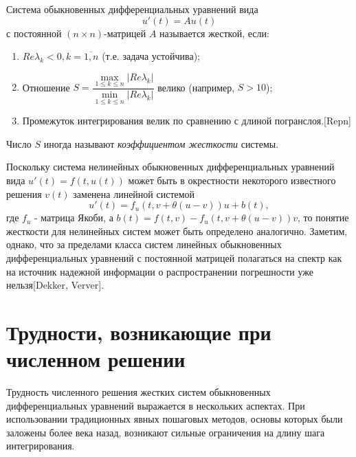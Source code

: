 \documentclass[a4paper,12pt]{report}
\begin{document}
  
\begin{Definition}Система обыкновенных дифференциальных уравнений вида
  \begin{equation}
  \label{stiff:eq}
    u'(t)=Au(t)
  \end{equation}
  с постоянной $(n \times n)$-матрицей $ A $ называется жесткой, если: 
  \begin{enumerate}
  \item $Re\lambda _k <0, k=\overbar{1,n}$ (т.е. задача устойчива);
  \item Отношение $S = \dfrac{\max\limits_{1\leq k\leq n} |Re\lambda _k|}{\min\limits_{1\leq k\leq n} |Re\lambda _k|} $ велико (например, $S > 10$);
  \item Промежуток интегрирования велик по сравнению с длиной погранслоя.[Repn]
  \end{enumerate}
\end{Definition}

Число $S$ иногда называют \textit{коэффициентом жесткости} системы. 


Поскольку система нелинейных обыкновенных дифференциальных уравнений вида $u'(t)=f(t, u(t))$ может быть в окрестности некоторого известного решения $v(t)$ заменена линейной системой 
$$u'(t) = f_u (t, v + \theta (u-v))u + b(t), $$
где $f_u$ - матрица Якоби, а $b(t) = f(t, v)-f_u(t,v + \theta (u-v))v$, то понятие жесткости для нелинейных систем может быть определено аналогично. Заметим, однако, что за пределами класса систем линейных обыкновенных дифференциальных уравнений с постоянной матрицей полагаться на спектр как на источник надежной информации о распространении погрешности уже нельзя[Dekker, Verver].

  
  \section{Трудности, возникающие при численном решении}
  \label{s:stiff_troubles} Трудность численного решения жестких систем обыкновенных дифференциальных уравнений выражается в нескольких аспектах. При использовании традиционных явных пошаговых методов, основы которых были заложены более века назад, возникают сильные ограничения на длину шага интегрирования.
  
\end{document}
